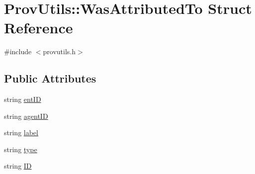 \hypertarget{struct_prov_utils_1_1_was_attributed_to}{\section{Prov\-Utils\-:\-:Was\-Attributed\-To Struct Reference}
\label{struct_prov_utils_1_1_was_attributed_to}
}


{\ttfamily \#include $<$provutils.\-h$>$}

\subsection*{Public Attributes}
\begin{DoxyCompactItemize}
\item 
string \hyperlink{struct_prov_utils_1_1_was_attributed_to_ad184c9fd74c7380da78c64720d02f135}{ent\-I\-D}
\item 
string \hyperlink{struct_prov_utils_1_1_was_attributed_to_abc7f19f78499d04010b362c336cea8cd}{agent\-I\-D}
\item 
string \hyperlink{struct_prov_utils_1_1_was_attributed_to_a5c9fd5945f07d753fe4eb146268c7b3f}{label}
\item 
string \hyperlink{struct_prov_utils_1_1_was_attributed_to_a0f0bb67866aaed93ef28d366f31ebede}{type}
\item 
string \hyperlink{struct_prov_utils_1_1_was_attributed_to_a8d6a730eeb6d8ecb68ae449e64c20634}{I\-D}
\end{DoxyCompactItemize}


